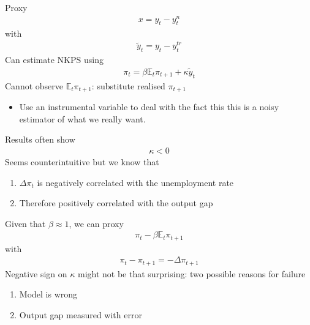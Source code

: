 \documentclass{beamer}
\begin{document}
\begin{frame}
 Proxy
 \begin{align}
  x=y_t-y_t^n
 \end{align}
 with
\begin{align}
  \tilde{y}_t=y_t-y_t^{tr}
\end{align}
\medskip
Can estimate NKPS using 
\begin{align}
  \pi_t = \beta \mathbb{E}_t \pi_{t+1} + \kappa\tilde{y}_t
\end{align}
\medskip
Cannot observe $\mathbb{E}_t \pi_{t+1}$: substitute realised $\pi_{t+1}$ 
\begin{itemize}
  \item Use an instrumental variable to deal with the fact this this is a noisy estimator of what we really want.
\end{itemize}
\end{frame}

\begin{frame}
  Results often show 
  \begin{align}
    \kappa<0
  \end{align}
  Seems counterintuitive but we know that
\begin{enumerate}
  \item $\Delta\pi_t$ is negatively correlated with the unemployment rate
  \item Therefore positively correlated with the output gap
\end{enumerate}
\end{frame}

\begin{frame}
  Given that $\beta\approx1$, we can proxy
\begin{align}
  \pi_t-\beta \mathbb{E}_t\pi_{t+1}
\end{align} 
with 
\begin{align}
  \pi_t-\pi_{t+1}=-\Delta\pi_{t+1}
\end{align}
Negative sign on $\kappa$ might not be that surprising: two possible reasons for failure
\begin{enumerate}
  \item Model is wrong
  \item Output gap measured with error
\end{enumerate}
\end{frame}
\end{document}
